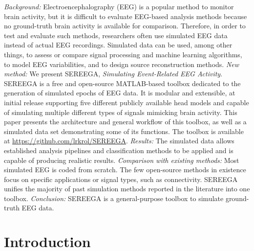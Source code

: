 \abstract%
\emph{Background:} Electroencephalography (EEG) is a popular method to monitor brain activity, but it is difficult to evaluate EEG-based analysis methods because no ground-truth brain activity is available for comparison. Therefore, in order to test and evaluate such methods, researchers often use simulated EEG data instead of actual EEG recordings. Simulated data can be used, among other things, to assess or compare signal processing and machine learning algorithms, to model EEG variabilities, and to design source reconstruction methods. \emph{New method:} We present SEREEGA, \emph{Simulating Event-Related EEG Activity}. SEREEGA is a free and open-source MATLAB-based toolbox dedicated to the generation of simulated epochs of EEG data. It is modular and extensible, at initial release supporting five different publicly available head models and capable of simulating multiple different types of signals mimicking brain activity. This paper presents the architecture and general workflow of this toolbox, as well as a simulated data set demonstrating some of its functions. The toolbox is available at \href{https://github.com/lrkrol/SEREEGA}{https://github.com/lrkrol/SEREEGA}. \emph{Results:} The simulated data allows established analysis pipelines and classification methods to be applied and is capable of producing realistic results. \emph{Comparison with existing methods:} Most simulated EEG is coded from scratch. The few open-source methods in existence focus on specific applications or signal types, such as connectivity. SEREEGA unifies the majority of past simulation methods reported in the literature into one toolbox. \emph{Conclusion:} SEREEGA is a general-purpose toolbox to simulate ground-truth EEG data.


\clearpage


\pagestyle{sereega}


\section{Introduction}

